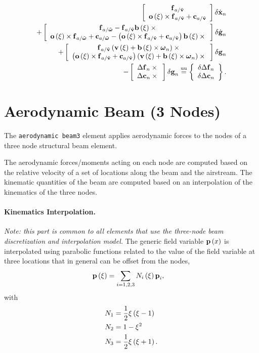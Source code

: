 \begin{align}
	\sqbr{\matr{c}{
		\T{f}_{a/\tilde{\T{v}}}
		\\
		\T{o}\plbr{\xi}\times\T{f}_{a/\tilde{\T{v}}} + \T{c}_{a/\tilde{\T{v}}}
	}} \delta\dot{\T{x}}_n
	\nonumber \\
	+ \sqbr{\matr{c}{
		\T{f}_{a/\tilde{\T{\omega}}} - \T{f}_{a/\tilde{\T{v}}} \T{b}\plbr{\xi}\times{}
		\\
		\T{o}\plbr{\xi} \times \T{f}_{a/\tilde{\T{\omega}}}
		+ \T{c}_{a/\tilde{\T{\omega}}}
		- \plbr{
			\T{o}\plbr{\xi} \times \T{f}_{a/\tilde{\T{v}}}
			+ \T{c}_{a/\tilde{\T{v}}}
		}
		\T{b}\plbr{\xi}\times{}
	}} \delta\dot{\T{g}}_n
	\nonumber \\
	+ \sqbr{\matr{c}{
		\T{f}_{a/\tilde{\T{v}}} \plbr{\T{v}\plbr{\xi} + \T{b}\plbr{\xi} \times \T{\omega}_n} \times{} \\
		\plbr{
			\T{o}\plbr{\xi} \times \T{f}_{a/\tilde{\T{v}}}
			+ \T{c}_{a/\tilde{\T{v}}}
		} \plbr{\T{v}\plbr{\xi} + \T{b}\plbr{\xi} \times \T{\omega}_n} \times{}
	}} \delta\T{g}_n
	\nonumber \\
	- \sqbr{\cvvect{
		\Delta\T{f}_n \times{} \\
		\Delta\T{c}_n \times{} \\
	}} \delta\T{g}_n
	\equu
	\cubr{\cvvect{
		\delta\Delta\T{f}_n \\
		\delta\Delta\T{c}_n
	}}
	.
\end{align}





\section{Aerodynamic Beam (3 Nodes)}
The \texttt{aerodynamic beam3} element applies aerodynamic forces
to the nodes of a three node structural beam element. 

The aerodynamic forces/moments acting on each node 
are computed based on the relative velocity of a set of locations
along the beam and the airstream.
The kinematic quantities of the beam are computed based
on an interpolation of the kinematics of the three nodes.

\paragraph{Kinematics Interpolation.}
\emph{Note: this part is common to all elements that use the
three-node beam discretization and interpolation model.}
The generic field variable $\T{p}\plbr{x}$ is interpolated
using parabolic functions related to the value of the field 
variable at three locations that in general can be offset
from the nodes,
\begin{align}
	\T{p}\plbr{\xi}
	&=
	\sum_{i=1,2,3} N_i\plbr{\xi} \T{p}_i
	,
\end{align}
with
\begin{subequations}
\begin{align}
	N_1 &= \frac{1}{2} \xi \plbr{\xi - 1}
	\\
	N_2 &= 1 - \xi^2
	\\
	N_3 &= \frac{1}{2} \xi \plbr{\xi + 1}
	.
\end{align}
\end{subequations}

